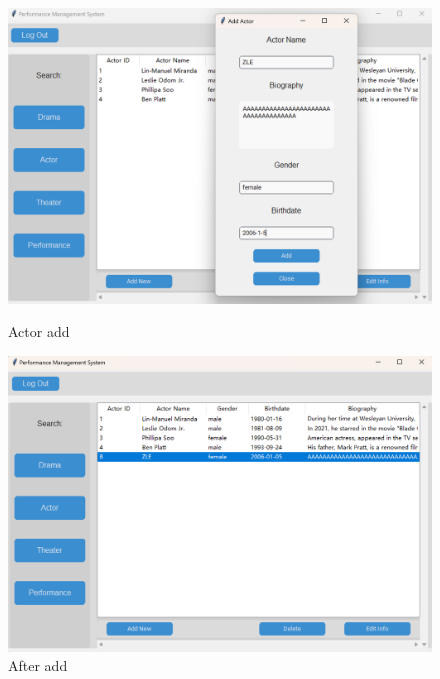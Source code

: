 \documentclass[12pt]{article}
\begin{document}
\begin{figure}[H]
    \centering
    \begin{minipage}{0.48\textwidth}
        \centering
        \includegraphics[width=\textwidth]{33.png}
        \caption{Actor add} 
        \label{Figure 33}
    \end{minipage}
    \hfill
    \begin{minipage}{0.48\textwidth}
        \centering
        \includegraphics[width=\textwidth]{34.png}
        \caption{After add}
        \label{Figure 34}
    \end{minipage}
\end{figure}
\end{document}
